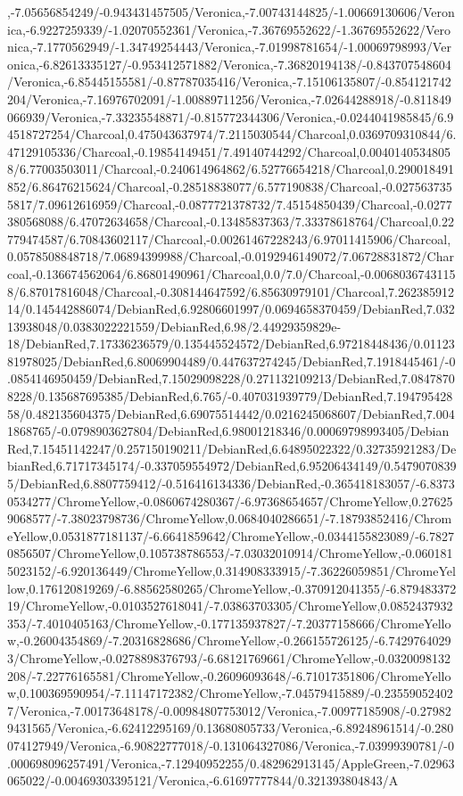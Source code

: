 {\begin{tikzternal}
,-7.05656854249/-0.943431457505/Veronica,-7.00743144825/-1.00669130606/Veronica,-6.9227259339/-1.02070552361/Veronica,-7.36769552622/-1.36769552622/Veronica,-7.1770562949/-1.34749254443/Veronica,-7.01998781654/-1.00069798993/Veronica,-6.82613335127/-0.953412571882/Veronica,-7.36820194138/-0.843707548604/Veronica,-6.85445155581/-0.87787035416/Veronica,-7.15106135807/-0.854121742204/Veronica,-7.16976702091/-1.00889711256/Veronica,-7.02644288918/-0.811849066939/Veronica,-7.33235548871/-0.815772344306/Veronica,-0.0244041985845/6.94518727254/Charcoal,0.475043637974/7.2115030544/Charcoal,0.0369709310844/6.47129105336/Charcoal,-0.19854149451/7.49140744292/Charcoal,0.00401405348058/6.77003503011/Charcoal,-0.240614964862/6.52776654218/Charcoal,0.290018491852/6.86476215624/Charcoal,-0.28518838077/6.577190838/Charcoal,-0.0275637355817/7.09612616959/Charcoal,-0.0877721378732/7.45154850439/Charcoal,-0.0277380568088/6.47072634658/Charcoal,-0.13485837363/7.33378618764/Charcoal,0.22779474587/6.70843602117/Charcoal,-0.00261467228243/6.97011415906/Charcoal,0.0578508848718/7.06894399988/Charcoal,-0.0192946149072/7.06728831872/Charcoal,-0.136674562064/6.86801490961/Charcoal,0.0/7.0/Charcoal,-0.00680367431158/6.87017816048/Charcoal,-0.308144647592/6.85630979101/Charcoal,7.26238591214/0.145442886074/DebianRed,6.92806601997/0.0694658370459/DebianRed,7.03213938048/0.0383022221559/DebianRed,6.98/2.44929359829e-18/DebianRed,7.17336236579/0.135445524572/DebianRed,6.97218448436/0.0112381978025/DebianRed,6.80069904489/0.447637274245/DebianRed,7.1918445461/-0.0854146950459/DebianRed,7.15029098228/0.271132109213/DebianRed,7.08478708228/0.135687695385/DebianRed,6.765/-0.407031939779/DebianRed,7.19479542858/0.482135604375/DebianRed,6.69075514442/0.0216245068607/DebianRed,7.0041868765/-0.0798903627804/DebianRed,6.98001218346/0.00069798993405/DebianRed,7.15451142247/0.257150190211/DebianRed,6.64895022322/0.32735921283/DebianRed,6.71717345174/-0.337059554972/DebianRed,6.95206434149/0.54790708395/DebianRed,6.8807759412/-0.516416134336/DebianRed,-0.365418183057/-6.83730534277/ChromeYellow,-0.0860674280367/-6.97368654657/ChromeYellow,0.276259068577/-7.38023798736/ChromeYellow,0.0684040286651/-7.18793852416/ChromeYellow,0.0531877181137/-6.6641859642/ChromeYellow,-0.0344155823089/-6.78270856507/ChromeYellow,0.105738786553/-7.03032010914/ChromeYellow,-0.0601815023152/-6.920136449/ChromeYellow,0.314908333915/-7.36226059851/ChromeYellow,0.176120819269/-6.88562580265/ChromeYellow,-0.370912041355/-6.87948337219/ChromeYellow,-0.0103527618041/-7.03863703305/ChromeYellow,0.0852437932353/-7.4010405163/ChromeYellow,-0.177135937827/-7.20377158666/ChromeYellow,-0.26004354869/-7.20316828686/ChromeYellow,-0.266155726125/-6.74297640293/ChromeYellow,-0.0278898376793/-6.68121769661/ChromeYellow,-0.0320098132208/-7.22776165581/ChromeYellow,-0.26096093648/-6.71017351806/ChromeYellow,0.100369590954/-7.11147172382/ChromeYellow,-7.04579415889/-0.235590524027/Veronica,-7.00173648178/-0.00984807753012/Veronica,-7.00977185908/-0.279829431565/Veronica,-6.62412295169/0.13680805733/Veronica,-6.89248961514/-0.280074127949/Veronica,-6.90822777018/-0.131064327086/Veronica,-7.03999390781/-0.000698096257491/Veronica,-7.12940952255/0.482962913145/AppleGreen,-7.02963065022/-0.00469303395121/Veronica,-6.61697777844/0.321393804843/A
\end{tikzternal}}

